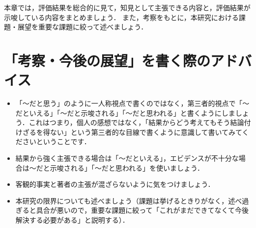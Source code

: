 本章では，評価結果を総合的に見て，知見として主張できる内容と，評価結果が示唆している内容をまとめましょう．
また，考察をもとに，本研究における課題・展望を重要な課題に絞って述べましょう．

\section{「考察・今後の展望」を書く際のアドバイス}
\begin{itemize}
    \item 「～だと思う」のように一人称視点で書くのではなく，第三者的視点で「～だといえる」「～だと示唆される」「～だと思われる」と書くようにしましょう．これはつまり，個人の感想ではなく，「結果からどう考えてもそう結論付けざるを得ない」という第三者的な目線で書くように意識して書いてみてくださいということです．
    \item 結果から強く主張できる場合は「～だといえる」，エビデンスが不十分な場合は～だと示唆される」「～だと思われる」を使いましょう．
    \item 客観的事実と著者の主張が混ざらないように気をつけましょう．
    \item 本研究の限界についても述べましょう（課題は挙げるときりがなく，述べ過ぎると具合が悪いので，重要な課題に絞って「これがまだできてなくて今後解決する必要がある」と説明する）．
\end{itemize}